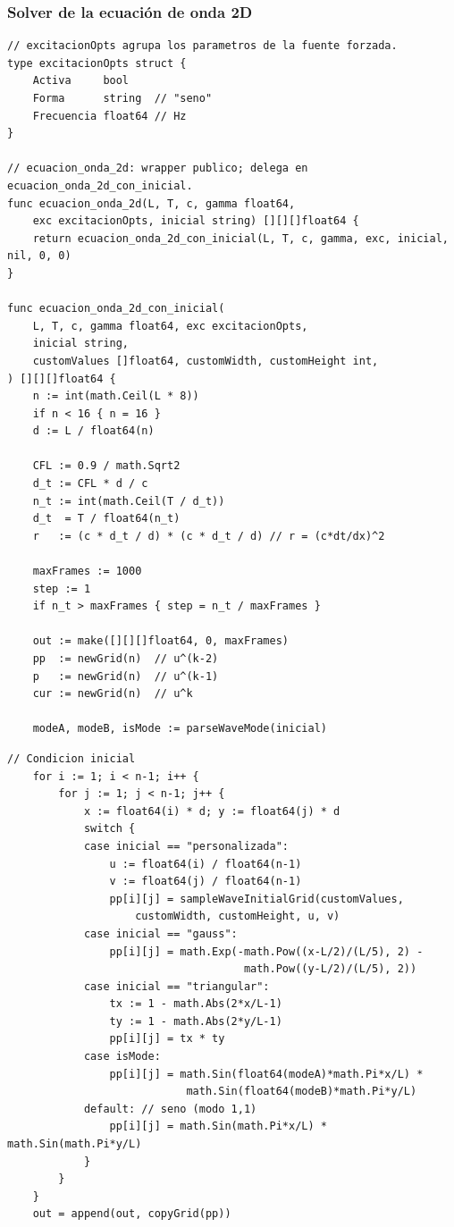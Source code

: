 \documentclass[12pt, a4paper]{article}
\begin{document}
\subsubsection{Solver de la ecuación de onda 2D}

\begin{lstlisting}[style=golang, caption={Parámetros y discretización del solver de onda}, label=lst:onda2d]
// excitacionOpts agrupa los parametros de la fuente forzada.
type excitacionOpts struct {
    Activa     bool
    Forma      string  // "seno"
    Frecuencia float64 // Hz
}

// ecuacion_onda_2d: wrapper publico; delega en ecuacion_onda_2d_con_inicial.
func ecuacion_onda_2d(L, T, c, gamma float64,
    exc excitacionOpts, inicial string) [][][]float64 {
    return ecuacion_onda_2d_con_inicial(L, T, c, gamma, exc, inicial, nil, 0, 0)
}

func ecuacion_onda_2d_con_inicial(
    L, T, c, gamma float64, exc excitacionOpts,
    inicial string,
    customValues []float64, customWidth, customHeight int,
) [][][]float64 {
    n := int(math.Ceil(L * 8))
    if n < 16 { n = 16 }
    d := L / float64(n)

    CFL := 0.9 / math.Sqrt2
    d_t := CFL * d / c
    n_t := int(math.Ceil(T / d_t))
    d_t  = T / float64(n_t)
    r   := (c * d_t / d) * (c * d_t / d) // r = (c*dt/dx)^2

    maxFrames := 1000
    step := 1
    if n_t > maxFrames { step = n_t / maxFrames }

    out := make([][][]float64, 0, maxFrames)
    pp  := newGrid(n)  // u^(k-2)
    p   := newGrid(n)  // u^(k-1)
    cur := newGrid(n)  // u^k

    modeA, modeB, isMode := parseWaveMode(inicial)
\end{lstlisting}

\begin{lstlisting}[style=golang, caption={Construcción de la condición inicial de la onda}]
    // Condicion inicial
    for i := 1; i < n-1; i++ {
        for j := 1; j < n-1; j++ {
            x := float64(i) * d; y := float64(j) * d
            switch {
            case inicial == "personalizada":
                u := float64(i) / float64(n-1)
                v := float64(j) / float64(n-1)
                pp[i][j] = sampleWaveInitialGrid(customValues,
                    customWidth, customHeight, u, v)
            case inicial == "gauss":
                pp[i][j] = math.Exp(-math.Pow((x-L/2)/(L/5), 2) -
                                     math.Pow((y-L/2)/(L/5), 2))
            case inicial == "triangular":
                tx := 1 - math.Abs(2*x/L-1)
                ty := 1 - math.Abs(2*y/L-1)
                pp[i][j] = tx * ty
            case isMode:
                pp[i][j] = math.Sin(float64(modeA)*math.Pi*x/L) *
                            math.Sin(float64(modeB)*math.Pi*y/L)
            default: // seno (modo 1,1)
                pp[i][j] = math.Sin(math.Pi*x/L) * math.Sin(math.Pi*y/L)
            }
        }
    }
    out = append(out, copyGrid(pp))
\end{lstlisting}
\end{document}
